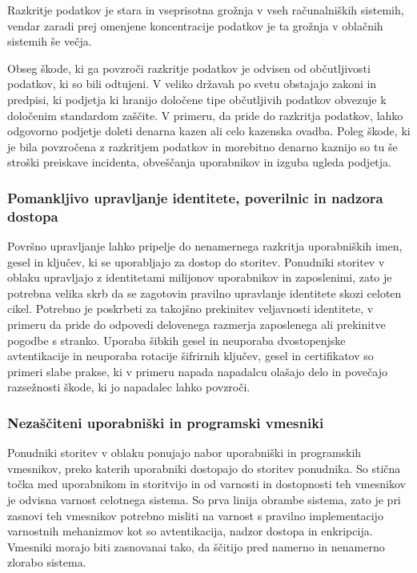 \documentclass[12pt,a4paper,openany]{book}
\begin{document}
Razkritje podatkov je stara in vseprisotna grožnja v vseh računalniških sistemih, vendar zaradi prej omenjene koncentracije podatkov je ta grožnja v oblačnih sistemih še večja.

Obseg škode, ki ga povzroči razkritje podatkov je odvisen od občutljivosti podatkov, ki so bili odtujeni. V veliko državah po svetu obstajajo zakoni in predpisi, ki podjetja ki hranijo določene tipe občutljivih podatkov obvezuje k določenim standardom zaščite. V primeru, da pride do razkritja podatkov, lahko odgovorno podjetje doleti denarna kazen ali celo kazenska ovadba. Poleg škode, ki je bila povzročena z razkritjem podatkov in morebitno denarno kaznijo so tu še stroški preiskave incidenta, obveščanja uporabnikov in izguba ugleda podjetja.

\subsubsection{Pomankljivo upravljanje identitete, poverilnic in nadzora dostopa}
Površno upravljanje lahko pripelje do nenamernega razkritja uporabniških imen, gesel in ključev, ki se uporabljajo za dostop do storitev. Ponudniki storitev v oblaku upravljajo z identitetami milijonov uporabnikov in zaposlenimi, zato je potrebna velika skrb da se zagotovin pravilno upravlanje identitete skozi celoten cikel. Potrebno je poskrbeti za takojšno prekinitev veljavnosti identitete, v primeru da pride do odpovedi delovenega razmerja zaposlenega ali prekinitve pogodbe s stranko. Uporaba šibkih gesel in neuporaba dvostopenjske avtentikacije in neuporaba rotacije šifrirnih ključev, gesel in certifikatov so primeri slabe prakse, ki v primeru napada napadalcu olašajo delo in povečajo razsežnosti škode, ki jo napadalec lahko povzroči.

\subsubsection{Nezaščiteni uporabniški in programski vmesniki}
Ponudniki storitev v oblaku ponujajo nabor uporabniški in programskih vmesnikov, preko katerih uporabniki dostopajo do storitev ponudnika. So stična točka med uporabnikom in storitvijo in od varnosti in dostopnosti teh vmesnikov je odvisna varnost celotnega sistema. So prva linija obrambe sistema, zato je pri zasnovi teh vmesnikov potrebno misliti na varnost s pravilno implementacijo varnostnih mehanizmov kot so avtentikacija, nadzor dostopa in enkripcija. Vmesniki morajo biti zasnovanai tako, da ščitijo pred namerno in nenamerno zlorabo sistema.
\end{document}
